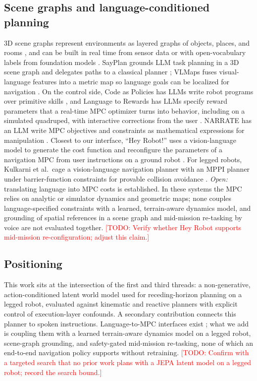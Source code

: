 \documentclass[conference]{IEEEtran}
\newcommand{\todo}[1]{\textcolor{red}{[TODO: #1]}}
\begin{document}
\subsection{Scene graphs and language-conditioned planning}
3D scene graphs represent environments as layered graphs of objects,
places, and rooms \cite{armeni2019scenegraph}, and can be built in real
time from sensor data \cite{hughes2022hydra} or with open-vocabulary
labels from foundation models \cite{gu2024conceptgraphs}. SayPlan grounds
LLM task planning in a 3D scene graph and delegates paths to a classical
planner \cite{rana2023sayplan}; VLMaps fuses visual-language features
into a metric map so language goals can be localized for navigation
\cite{huang2023vlmaps}. On the control side, Code as Policies has LLMs
write robot programs over primitive skills \cite{liang2023cap}, and
Language to Rewards has LLMs specify reward parameters that a real-time
MPC optimizer turns into behavior, including on a simulated quadruped,
with interactive corrections from the user \cite{yu2023l2r}. NARRATE has
an LLM write MPC objectives and constraints as mathematical expressions
for manipulation \cite{ismail2024narrate}. Closest to our interface,
``Hey Robot!'' uses a vision-language model to generate the cost
function and reconfigure the parameters of a navigation MPC from user
instructions on a ground robot \cite{martinezbaselga2024heyrobot}. For
legged robots, Kulkarni et al.\ cage a vision-language navigation
planner with an MPPI planner under barrier-function constraints for
provable collision avoidance \cite{kulkarni2026caging}.
\emph{Open:} translating language into MPC costs is established. In
these systems the MPC relies on analytic or simulator dynamics and
geometric maps; none couples language-specified constraints with a
learned, terrain-aware dynamics model, and grounding of spatial
references in a scene graph and mid-mission re-tasking by voice are
not evaluated together. \todo{Verify whether Hey Robot supports
mid-mission re-configuration; adjust this claim.}

\subsection{Positioning}
This work sits at the intersection of the first and third threads: a
non-generative, action-conditioned latent world model used for
receding-horizon planning on a legged robot, evaluated against
kinematic and reactive planners with explicit control of execution-layer
confounds. A secondary contribution connects this planner to spoken
instructions. Language-to-MPC interfaces exist
\cite{martinezbaselga2024heyrobot,ismail2024narrate}; what we add is
coupling them with a learned terrain-aware dynamics model on a legged
robot, scene-graph grounding, and safety-gated mid-mission re-tasking,
none of which an end-to-end navigation policy supports without
retraining. \todo{Confirm with a targeted search that no prior work plans
with a JEPA latent model on a legged robot; record the search bound.}
\end{document}
